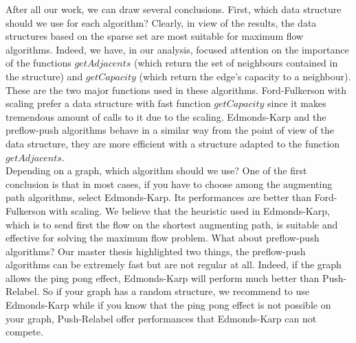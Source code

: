 
After all our work, we can draw several conclusions. First, which data structure should we use for each algorithm? Clearly, in view of the results, the data structures based on the sparse set are most suitable for maximum flow algorithms. Indeed, we have, in our analysis, focused attention on the importance of the functions $getAdjacents$ (which return the set of neighbours contained in the structure) and $getCapacity$ (which return the edge's capacity to a neighbour). These are the two major functions used in these algorithms. Ford-Fulkerson with scaling prefer a data structure with fast function $getCapacity$ since it makes tremendous amount of calls to it due to the scaling. Edmonds-Karp and the preflow-push algorithms behave in a similar way from the point of view of the data structure, they are more efficient with a structure adapted to the function $getAdjacents$.
\\

Depending on a graph, which algorithm should we use? One of the first conclusion is that in most cases, if you have to choose among the augmenting path algorithms, select Edmonds-Karp. Its performances are better than Ford-Fulkerson with scaling. We believe that the heuristic used in Edmonds-Karp, which is to send first the flow on the shortest augmenting path, is suitable and effective for solving the maximum flow problem. What about preflow-push algorithms? Our master thesis highlighted two things, the preflow-push algorithms can be extremely fast but are not regular at all. Indeed, if the graph allows the ping pong effect, Edmonds-Karp will perform much better than Push-Relabel. So if your graph has a random structure, we recommend to use Edmonds-Karp while if you know that the ping pong effect is not possible on your graph, Push-Relabel offer performances that Edmonds-Karp can not compete.